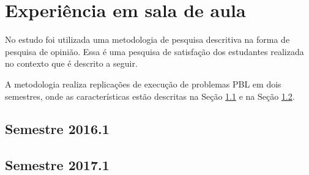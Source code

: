 \section{Experiência em sala de aula}
\label{sec-experiencia}

No estudo foi utilizada uma metodologia de pesquisa descritiva na forma
de pesquisa de opinião.
Essa é uma pesquisa de satisfação dos estudantes
realizada no contexto que é descrito a seguir.

A metodologia realiza replicações de execução de problemas
\ac{PBL} em dois semestres, onde as características
estão descritas na Seção \ref{sec-exp-2016} e na Seção \ref{sec-exp-2017}.



\subsection{Semestre 2016.1}
\label{sec-exp-2016}

\subsection{Semestre 2017.1}
\label{sec-exp-2017}
